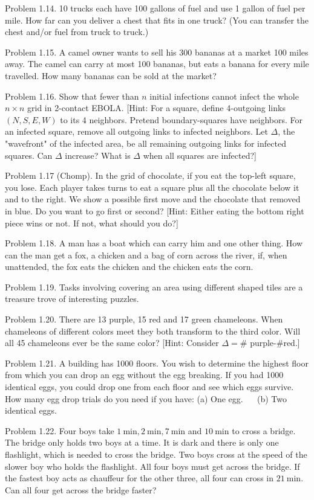 \documentclass[10pt]{article}
\begin{document}
Problem 1.14. 10 trucks each have 100 gallons of fuel and use 1 gallon of fuel per mile. How far can you deliver a chest that fits in one truck? (You can transfer the chest and/or fuel from truck to truck.)

Problem 1.15. A camel owner wants to sell his 300 bananas at a market 100 miles away. The camel can carry at most 100 bananas, but eats a banana for every mile travelled. How many bananas can be sold at the market?

Problem 1.16. Show that fewer than $n$ initial infections cannot infect the whole $n \times n$ grid in 2-contact EBOLA. [Hint: For a square, define 4-outgoing links $(N, S, E, W)$ to its 4 neighbors. Pretend boundary-squares have neighbors. For an infected square, remove all outgoing links to infected neighbors. Let $\Delta$, the "wavefront" of the infected area, be all remaining outgoing links for infected squares. Can $\Delta$ increase? What is $\Delta$ when all squares are infected?]

Problem 1.17 (Chomp). In the grid of chocolate, if you eat the top-left square, you lose. Each player takes turns to eat a square plus all the chocolate below it and to the right. We show a possible first move and the chocolate that removed in blue. Do you want to go first or second? [Hint: Either eating the bottom right piece wins or not. If not, what should you do?]

Problem 1.18. A man has a boat which can carry him and one other thing. How can the man get a fox, a chicken and a bag of corn across the river, if, when unattended, the fox eats the chicken and the chicken eats the corn.

Problem 1.19. Tasks involving covering an area using different shaped tiles are a treasure trove of interesting puzzles.

Problem 1.20. There are 13 purple, 15 red and 17 green chameleons. When chameleons of different colors meet they both transform to the third color. Will all 45 chameleons ever be the same color? [Hint: Consider $\Delta=\#$ purple-\#red.]

Problem 1.21. A building has 1000 floors. You wish to determine the highest floor from which you can drop an egg without the egg breaking. If you had 1000 identical eggs, you could drop one from each floor and see which eggs survive. How many egg drop trials do you need if you have: (a) One egg. $\quad$ (b) Two identical eggs.

Problem 1.22. Four boys take $1 \mathrm{~min}, 2 \mathrm{~min}, 7 \mathrm{~min}$ and $10 \mathrm{~min}$ to cross a bridge. The bridge only holds two boys at a time. It is dark and there is only one flashlight, which is needed to cross the bridge. Two boys cross at the speed of the slower boy who holds the flashlight. All four boys must get across the bridge. If the fastest boy acts as chauffeur for the other three, all four can cross in $21 \mathrm{~min}$. Can all four get across the bridge faster?
\end{document}
